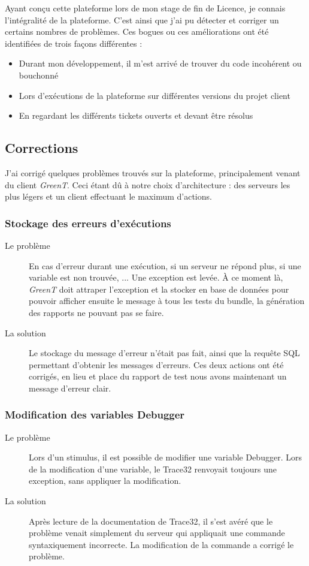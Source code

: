 Ayant conçu cette plateforme lors de mon stage de fin de Licence, je connais l'intégralité de la plateforme. C'est ainsi que j'ai pu détecter et corriger un certains nombres de problèmes. Ces bogues ou ces améliorations ont été identifiées de trois façons différentes : 
\begin{itemize}
	\item Durant mon développement, il m'est arrivé de trouver du code incohérent ou bouchonné
	\item Lors d'exécutions de la plateforme sur différentes versions du projet client
	\item En regardant les différents tickets ouverts et devant être résolus
\end{itemize}

\subsection{Corrections}
J'ai corrigé quelques problèmes trouvés sur la plateforme, principalement venant du client \textit{GreenT}. Ceci étant dû à notre choix d'architecture : des serveurs les plus légers et un client effectuant le maximum d'actions.
	\subsubsection{Stockage des erreurs d'exécutions}
	\begin{description}
		\item[Le problème] En cas d'erreur durant une exécution, si un serveur ne répond plus, si une variable est non trouvée, ... Une exception est levée. À ce moment là, \textit{GreenT} doit attraper l'exception et la stocker en base de données pour pouvoir afficher ensuite le message à tous les tests du bundle, la génération des rapports ne pouvant pas se faire.
		\item[La solution] Le stockage du message d'erreur n'était pas fait, ainsi que la requête SQL permettant d'obtenir les messages d'erreurs. Ces deux actions ont été corrigés, en lieu et place du rapport de test nous avons maintenant un message d'erreur clair.
		\end{description}
		
	\subsubsection{Modification des variables Debugger}
		\begin{description}
			\item[Le problème] Lors d'un stimulus, il est possible de modifier une variable Debugger. Lors de la modification d'une variable, le Trace32 renvoyait toujours une exception, sans appliquer la modification.
			\item[La solution] Après lecture de la documentation de Trace32, il s'est avéré que le problème venait simplement du serveur qui appliquait une commande syntaxiquement incorrecte. La modification de la commande a corrigé le problème.
	\end{description}
	
